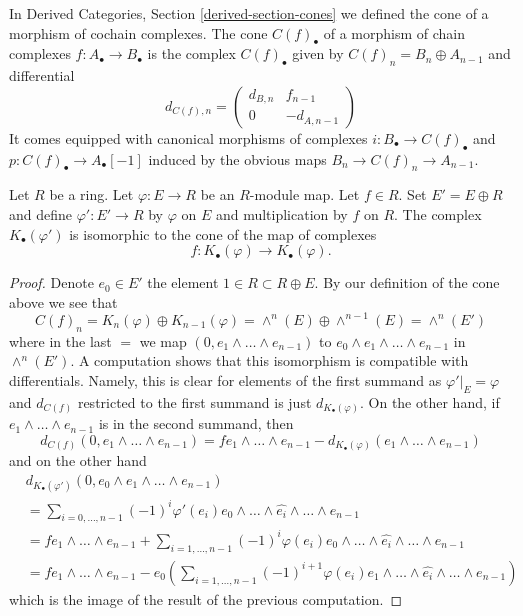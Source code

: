 \noindent
In
Derived Categories, Section \ref{derived-section-cones}
we defined the cone of a morphism of cochain complexes.
The cone $C(f)_\bullet$ of a morphism of chain complexes
$f : A_\bullet \to B_\bullet$ is the complex $C(f)_\bullet$ given by
$C(f)_n = B_n \oplus A_{n - 1}$ and differential
\begin{equation}
\label{equation-differential-cone}
d_{C(f), n} =
\left(
\begin{matrix}
d_{B, n} & f_{n - 1} \\
0 & -d_{A, n - 1}
\end{matrix}
\right)
\end{equation}
It comes equipped with canonical morphisms of complexes
$i : B_\bullet \to C(f)_\bullet$ and
$p : C(f)_\bullet \to A_\bullet[-1]$
induced by the obvious maps $B_n \to C(f)_n \to A_{n - 1}$.

\begin{lemma}
\label{lemma-cone-koszul-abstract}
Let $R$ be a ring. Let $\varphi : E \to R$ be an $R$-module map.
Let $f \in R$. Set $E' = E \oplus R$ and define $\varphi' : E' \to R$
by $\varphi$ on $E$ and multiplication by $f$ on $R$.
The complex $K_\bullet(\varphi')$ is isomorphic to the
cone of the map of complexes
$$
f :
K_\bullet(\varphi)
\longrightarrow
K_\bullet(\varphi).
$$
\end{lemma}

\begin{proof}
Denote $e_0 \in E'$ the element $1 \in R \subset R \oplus E$.
By our definition of the cone above we see that
$$
C(f)_n = K_n(\varphi) \oplus K_{n - 1}(\varphi) =
\wedge^n(E) \oplus \wedge^{n - 1}(E) = \wedge^n(E')
$$
where in the last $=$ we map $(0, e_1 \wedge \ldots \wedge e_{n - 1})$
to $e_0 \wedge e_1 \wedge \ldots \wedge e_{n - 1}$ in $\wedge^n(E')$.
A computation shows that this isomorphism is compatible with
differentials. Namely, this is clear for elements of the first
summand as $\varphi'|_E = \varphi$ and $d_{C(f)}$ restricted to
the first summand is just $d_{K_\bullet(\varphi)}$.
On the other hand, if $e_1 \wedge \ldots \wedge e_{n - 1}$
is in the second summand, then
$$
d_{C(f)}(0, e_1 \wedge \ldots \wedge e_{n - 1}) =
fe_1 \wedge \ldots \wedge e_{n - 1}
- d_{K_\bullet(\varphi)}(e_1 \wedge \ldots \wedge e_{n - 1})
$$
and on the other hand
\begin{align*}
& d_{K_\bullet(\varphi')}(0, e_0 \wedge e_1 \wedge \ldots \wedge e_{n - 1}) \\
& =
\sum\nolimits_{i = 0, \ldots, n - 1}
(-1)^i \varphi'(e_i)e_0 \wedge \ldots \wedge \widehat{e_i}
\wedge \ldots \wedge e_{n - 1} \\
& =
fe_1 \wedge \ldots \wedge e_{n - 1} +
\sum\nolimits_{i = 1, \ldots, n - 1}
(-1)^i \varphi(e_i)e_0 \wedge \ldots \wedge \widehat{e_i}
\wedge \ldots \wedge e_{n - 1} \\
& =
fe_1 \wedge \ldots \wedge e_{n - 1} -
e_0 \left(\sum\nolimits_{i = 1, \ldots, n - 1}
(-1)^{i + 1} \varphi(e_i)e_1 \wedge \ldots \wedge \widehat{e_i}
\wedge \ldots \wedge e_{n - 1}\right)
\end{align*}
which is the image of the result of the previous computation.
\end{proof}

